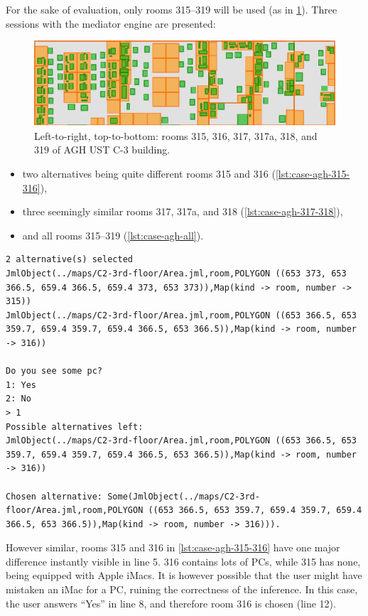 For the sake of evaluation, only rooms 315--319 will be used (as in \cref{fig:case-agh-rooms}). Three sessions with the mediator engine are presented:

\begin{figure}
	\centering
	\includegraphics[width=\textwidth]{case-agh-rooms}
	\caption{Left-to-right, top-to-bottom: rooms 315, 316, 317, 317a, 318, and 319 of AGH UST C-3 building.}
	\label{fig:case-agh-rooms}
\end{figure}

\begin{itemize}
	\item two alternatives being quite different rooms 315 and 316 (\cref{lst:case-agh-315-316}),
	\item three seemingly similar rooms 317, 317a, and 318 (\cref{lst:case-agh-317-318}),
	\item and all rooms 315--319 (\cref{lst:case-agh-all}).
\end{itemize}

\begin{lstlisting}[label={lst:case-agh-315-316},caption={Mediation between rooms 315 and 316.}]
2 alternative(s) selected
JmlObject(../maps/C2-3rd-floor/Area.jml,room,POLYGON ((653 373, 653 366.5, 659.4 366.5, 659.4 373, 653 373)),Map(kind -> room, number -> 315))
JmlObject(../maps/C2-3rd-floor/Area.jml,room,POLYGON ((653 366.5, 653 359.7, 659.4 359.7, 659.4 366.5, 653 366.5)),Map(kind -> room, number -> 316))

Do you see some pc?
1: Yes
2: No
> 1
Possible alternatives left:
JmlObject(../maps/C2-3rd-floor/Area.jml,room,POLYGON ((653 366.5, 653 359.7, 659.4 359.7, 659.4 366.5, 653 366.5)),Map(kind -> room, number -> 316))

Chosen alternative: Some(JmlObject(../maps/C2-3rd-floor/Area.jml,room,POLYGON ((653 366.5, 653 359.7, 659.4 359.7, 659.4 366.5, 653 366.5)),Map(kind -> room, number -> 316))).
\end{lstlisting}

However similar, rooms 315 and 316 in \cref{lst:case-agh-315-316} have one major difference instantly visible in line 5. 316 contains lots of PCs, while 315 has none, being equipped with Apple iMacs. It is however possible that the user might have mistaken an iMac for a PC, ruining the correctness of the inference. In this case, the user answers ``Yes'' in line 8, and therefore room 316 is chosen (line 12).

